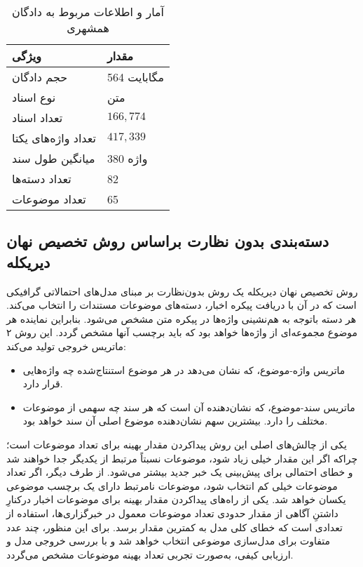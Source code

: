 \begin{table} [h!]
	\caption{آمار و اطلاعات مربوط به دادگان همشهری}
	\label{table.hamshahri}
	\begin{center}
		\begin{tabular}{|M{6cm}|M{4cm}|}
			\hline
				ویژگی & مقدار \\
			\hline
			\hline
			حجم دادگان & 564 مگابایت \\ \hline
			نوع اسناد & متن \\ \hline
			تعداد اسناد & $166,774$ \\ \hline
			تعداد واژه‌های یکتا & $417,339$ \\ \hline
			میانگین طول سند & 380 واژه \\ \hline
			تعداد دسته‌ها & 82 \\ \hline
			تعداد موضوعات & 65 \\ \hline
		\end{tabular}
	\end{center}
\end{table}

\subsection{دسته‌بندی بدون‌ نظارت براساس روش تخصیص نهان دیریکله}
\label{section.lda_classification}
روش تخصیص نهان دیریکله \citep{blei2003latent} یک روش بدون‌نظارت بر مبنای مدل‌های احتمالاتی گرافیکی است که در آن با دریافت  پیکره  اخبار، دسته‌های موضوعات مستندات را انتخاب می‌کند. هر دسته باتوجه ‌به هم‌نشینی واژه‌ها در پیکره متن مشخص می‌شود. بنابراین نماینده هر موضوع مجموعه‌ای از واژه‌ها خواهد بود که باید برچسب آنها مشخص گردد. این روش  ۲ ماتریس خروجی تولید می‌کند:
\begin{itemize}
	\item
ماتریس واژه-موضوع، که نشان می‌دهد در هر موضوع استنتاج‌شده چه واژه‌هایی قرار دارد.
	\item
ماتریس سند-موضوع، که نشان‌دهنده آن است که هر سند چه سهمی از موضوعات مختلف را دارد. بیشترین سهم نشان‌دهنده موضوع اصلی آن سند خواهد بود.
\end{itemize}
یکی از چالش‌های اصلی این روش پیداکردن مقدار بهینه برای تعداد موضوعات است؛ چراکه اگر این مقدار خیلی زیاد شود، موضوعات نسبتاً مرتبط از یکدیگر جدا خواهند شد و خطای احتمالی برای پیش‌بینی یک خبر جدید بیشتر می‌شود. از طرف دیگر، اگر تعداد موضوعات خیلی کم انتخاب شود، موضوعات نامرتبط دارای یک برچسب موضوعی یکسان خواهد شد. یکی از راه‌های پیداکردن مقدار بهینه برای موضوعات اخبار درکنارِ داشتنِ آگاهی از مقدار حدودی تعداد موضوعات معمول در خبرگزاری‌ها، استفاده از تعدادی است که خطای کلی مدل به کمترین مقدار برسد. برای این منظور، چند عدد متفاوت برای مدل‌سازی موضوعی انتخاب خواهد شد و با بررسی خروجی مدل و ارزیابی کیفی، به‌صورت تجربی تعداد بهینه موضوعات مشخص می‌گردد.

